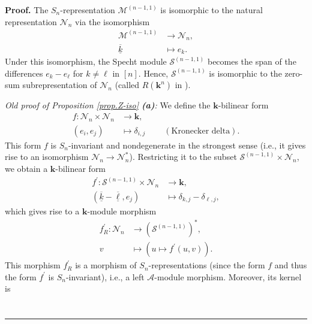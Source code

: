 \documentclass[numbers=enddot,12pt,final,onecolumn,notitlepage]{scrartcl}%
\theoremstyle{definition}
\newenvironment{noncompile}{}{}
\newenvironment{proof}[1][Proof]{\noindent\textbf{#1.} }{\ \rule{0.5em}{0.5em}}
\begin{document}
\begin{proof}
The $S_{n}$-representation $\mathcal{M}^{\left(  n-1,1\right)  }$ is
isomorphic to the natural representation $\mathcal{N}_{n}$ via the isomorphism%
\begin{align*}
\mathcal{M}^{\left(  n-1,1\right)  }  &  \rightarrow\mathcal{N}_{n},\\
\underline{\overline{k}}  &  \mapsto e_{k}.
\end{align*}
Under this isomorphism, the Specht module $\mathcal{S}^{\left(  n-1,1\right)
}$ becomes the span of the differences $e_{k}-e_{\ell}$ for $k\neq\ell$ in
$\left[  n\right]  $. Hence, $\mathcal{S}^{\left(  n-1,1\right)  }$ is
isomorphic to the zero-sum subrepresentation of $\mathcal{N}_{n}$ (called
$R\left(  \mathbf{k}^{n}\right)  $ in \cite[\S 4.2.5]{sga}). \medskip

\begin{noncompile}
\textit{Old proof of Proposition \ref{prop.Z-iso} \textbf{(a)}:} We define the
$\mathbf{k}$-bilinear form%
\begin{align*}
f:\mathcal{N}_{n}\times\mathcal{N}_{n}  &  \rightarrow\mathbf{k},\\
\left(  e_{i},e_{j}\right)   &  \mapsto\delta_{i,j}\ \ \ \ \ \ \ \ \ \ \left(
\text{Kronecker delta}\right)  .
\end{align*}
This form $f$ is $S_{n}$-invariant and nondegenerate in the strongest sense
(i.e., it gives rise to an isomorphism $\mathcal{N}_{n}\rightarrow
\mathcal{N}_{n}^{\ast}$). Restricting it to the subset $\mathcal{S}^{\left(
n-1,1\right)  }\times\mathcal{N}_{n}$, we obtain a $\mathbf{k}$-bilinear form%
\begin{align*}
f^{\prime}:\mathcal{S}^{\left(  n-1,1\right)  }\times\mathcal{N}_{n}  &
\rightarrow\mathbf{k},\\
\left(  \underline{\overline{k}}-\underline{\overline{\ell}},e_{j}\right)   &
\mapsto\delta_{k,j}-\delta_{\ell,j},
\end{align*}
which gives rise to a $\mathbf{k}$-module morphism
\begin{align*}
f_{R}^{\prime}:\mathcal{N}_{n}  &  \rightarrow\left(  \mathcal{S}^{\left(
n-1,1\right)  }\right)  ^{\ast},\\
v  &  \mapsto\left(  u\mapsto f^{\prime}\left(  u,v\right)  \right)  .
\end{align*}
This morphism $f_{R}^{\prime}$ is a morphism of $S_{n}$-representations (since
the form $f$ and thus the form $f^{\prime}$ is $S_{n}$-invariant), i.e., a
left $\mathcal{A}$-module morphism. Moreover, its kernel is%
\begin{align*}

\end{align*}
\end{noncompile}
\end{proof}
\end{document}
